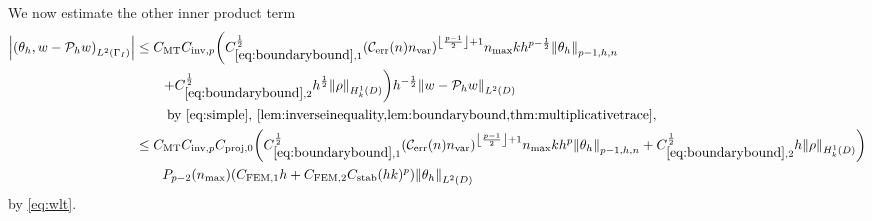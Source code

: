 We now estimate the other inner product term
\begin{align}
\abs{\IPLtGI{\thetah}{w - \Ph w}} &\leq \CMT\CinvVhp\mleft(\Cboundaryo^{\half} \mleft(\En\nvar\mright)^{\floor{\frac{p-1}2}+1}\nmax k h^{p-\half} \Nfn{p-1,h,n}{\thetah}\mright.\nonumber\\
&\mleft.\quad\quad+ \Cboundaryt^{\half} h^{\half} \NHokD{\rho}\mright) h^{-\half}\NLtD{w - \Ph w}\nonumber\\
&\quad\quad\text{ by \cref{eq:simple}, \cref{lem:inverseinequality,lem:boundarybound,thm:multiplicativetrace},}
\nonumber\\
&\leq \CMT \CinvVhp \Cprojfn{0}\mleft(\Cboundaryo^{\half} \mleft(\En\nvar\mright)^{\floor{\frac{p-1}2}+1}\nmax k h^{p} \Nfn{p-1,h,n}{\thetah} + \Cboundaryt^{\half} h \NHokD{\rho}\mright)\nonumber\\
&\quad\quad \Pfn{p-2}\mleft(\nmax\mright)\mleft(\CFEMotilde h + \CFEMttilde \CAnk (hk)^p\mright)\NLtD{\thetah}\label{eq:innerprod2}
\end{align}
 by \cref{eq:wlt}.

